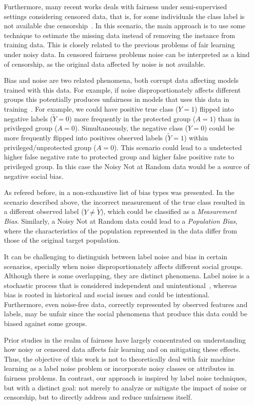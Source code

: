 Furthermore, many recent works deals with fairness under semi-supervised settings considering censored data, that is, for some individuals the class label is not available due censorship~\cite{WZhang2022,WZhang2023_a,WZhang2023_b,WZhang2023_c}. In this scenario, the main approach is to use some technique to estimate the missing data instead of removing the instance from training data. This is closely related to the previous problems of fair learning under noisy data. In censored fairness problems noise can be interpreted as a kind of censorship, as the original data affected by noise is not available.

Bias and noise are two related phenomena, both corrupt data affecting models trained with this data. For example, if noise disproportionately affects different groups this potentially produces unfairness in models that uses this data in training~\citep{Wang2021}. For example, we could have positive true class ($Y = 1$) flipped into negative labels ($\tilde{Y} =0$) more frequently in the protected group ($A = 1$) than in privileged group ($A = 0$). Simultaneously, the negative class ($Y = 0$) could be more frequently flipped into positives observed labels ($\tilde{Y} = 1$) within privileged/unprotected group ($A = 0$). This scenario could lead to a undetected higher false negative rate to protected group and higher false positive rate to privileged group. In this case the Noisy Not at Random data would be a source of negative social bias.

As refered before, in \cite{Mehrabi2019} a non-exhaustive list of bias types was presented. In the scenario described above, the incorrect measurement of the true class resulted in a different observed label ($Y \neq \tilde{Y}$), which could be classified as a \textit{Measurement Bias}. Similarly, a Noisy Not at Random data could lead to a \textit{Population Bias}, where the characteristics of the population represented in the data differ from those of the original target population.

It can be challenging to distinguish between label noise and bias in certain scenarios, specially when noise disproportionately affects different social groups. Although there is some overlapping, they are distinct phenomena. Label noise is a stochastic process that is considered independent and unintentional~\citep{Frenay2014}, whereas bias is rooted in historical and social issues and could be intentional. Furthermore, even noise-free data, correctly represented by observed features and labels, may be unfair since the social phenomena that produce this data could be biased against some groups. 

Prior studies in the realm of fairness have largely concentrated on understanding how noisy or censored data affects fair learning and on mitigating these effects. Thus, the objective of this work is not to theoretically deal with fair machine learning as a label noise problem or incorporate noisy classes or attributes in fairness problems. In contrast, our approach is inspired by label noise techniques, but with a distinct goal: not merely to analyze or mitigate the impact of noise or censorship, but to directly address and reduce unfairness itself.
